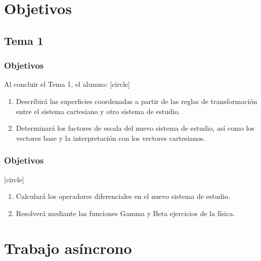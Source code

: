 \documentclass[12pt]{beamer}
\begin{document}
\section{Objetivos}

\subsection{Tema 1}
\begin{frame}
\frametitle{Objetivos}
Al concluir el Tema 1, el alumno:
[circle]
\begin{enumerate}[<+->]
\item Describirá las superficies coordenadas a partir de las reglas de transformación entre el sistema cartesiano y otro sistema de estudio.
\item Determinará los factores de escala del nuevo sistema de estudio, así como los vectores base y la interpretación con los vectores cartesianos.
\seti
\end{enumerate}
\end{frame}
\begin{frame}
\frametitle{Objetivos}
[circle]
\begin{enumerate}[<+->]
\conti
\item Calculará los operadores diferenciales en el nuevo sistema de estudio.
\item Resolverá mediante las funciones Gamma y Beta ejercicios de la física.
\end{enumerate}
\end{frame}
\section{Trabajo asíncrono}
\end{document}
